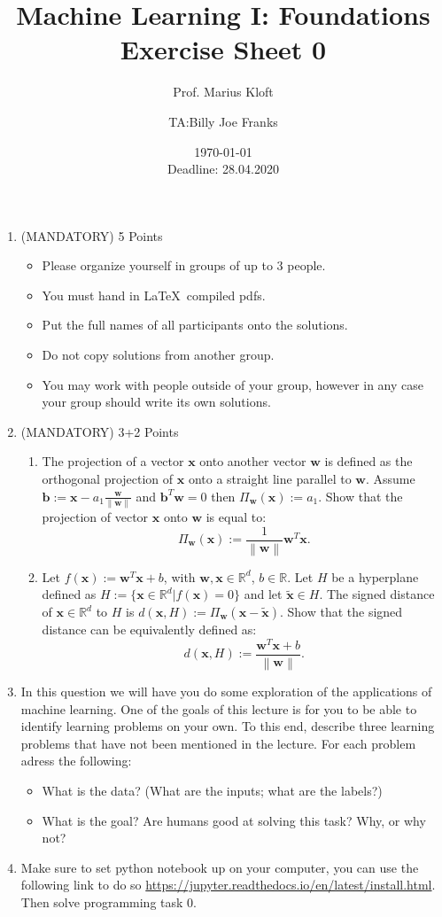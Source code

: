 \documentclass[]{scrartcl}
\author{Prof. Marius Kloft \and TA:Billy Joe Franks}
\title{Machine Learning I: Foundations \\ Exercise Sheet 0}
\date{\today\\Deadline: 28.04.2020}
\newcommand{\R}{\mathbb{R}}
\newcommand{\bx}{\mathbf{x}}
\newcommand{\bb}{\mathbf{b}}
\newcommand{\bw}{\mathbf{w}}
\begin{document}
\maketitle

\begin{enumerate}
\item (MANDATORY) 5 Points
	\begin{itemize}
	\item Please organize yourself in groups of up to 3 people.
	\item You must hand in \LaTeX~compiled pdfs.
	\item Put the full names of all participants onto the solutions.
	\item Do not copy solutions from another group.
	\item You may work with people outside of your group, however in any case your group should write its own solutions.
	\end{itemize}
\item (MANDATORY) 3+2 Points
	\begin{enumerate}
	\item The projection of a vector $\bx$ onto another vector $\bw$ is defined as the orthogonal projection of $\bx$ onto a straight line parallel to $\bw$. Assume $\bb:=\bx-a_1\frac{\bw}{\left\lVert\bw\right\rVert}$ and $\bb^T\bw=0$ then $\Pi_\bw(\bx):=a_1$. Show that the projection of vector $\bx$ onto $\bw$ is equal to:
	\begin{equation*}
	\Pi_\bw(\bx):=\frac{1}{\left\lVert\bw\right\rVert}\bw^T\bx.
	\end{equation*}
	\item Let $f(\bx):=\bw^T\bx+b$, with $\bw, \bx \in \R^d$, $b\in \R$. Let $H$ be a hyperplane defined as $H:=\{\bx \in \R^d|f(\bx)=0\}$ and let $\tilde{\bx}\in H$. The signed distance of $\bx \in \R^d$ to $H$ is $d(\bx,H):=\Pi_\bw(\bx-\tilde{\bx})$. Show that the signed distance can be equivalently defined as:
	\begin{equation*}
	d(\bx,H):=\frac{\bw^T\bx+b}{\left\lVert\bw\right\rVert}.
	\end{equation*}
	\end{enumerate}
\newpage
\item In this question we will have you do some exploration of the applications of machine learning. One of the goals of this lecture is for you to be able to identify learning problems on your own. To this end, describe three learning problems that have not been mentioned in the lecture. For each problem adress the following:
	\begin{itemize}
	\item What is the data? (What are the inputs; what are the labels?)
	\item What is the goal? Are humans good at solving this task? Why, or why not?
	\end{itemize}
\item Make sure to set python notebook up on your computer, you can use the following link to do so \url{https://jupyter.readthedocs.io/en/latest/install.html}. Then solve programming task 0.
\end{enumerate}
\end{document}
